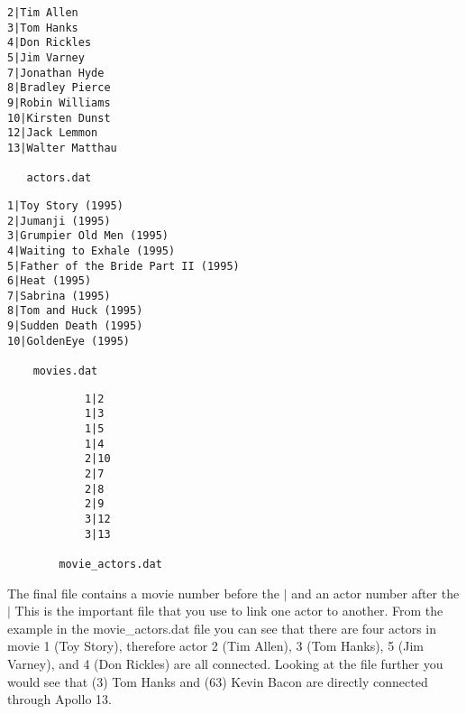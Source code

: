 \documentclass[11pt]{article}
\begin{document}
    \begin{minipage}[b]{0.33\textwidth}    
    \begin{verbatim}
2|Tim Allen
3|Tom Hanks
4|Don Rickles
5|Jim Varney
7|Jonathan Hyde
8|Bradley Pierce
9|Robin Williams
10|Kirsten Dunst
12|Jack Lemmon
13|Walter Matthau

   actors.dat
     \end{verbatim}
     \end{minipage}%
    \begin{minipage}[b]{0.33\textwidth}
    \begin{verbatim}
1|Toy Story (1995)
2|Jumanji (1995)
3|Grumpier Old Men (1995)
4|Waiting to Exhale (1995)
5|Father of the Bride Part II (1995)
6|Heat (1995)
7|Sabrina (1995)
8|Tom and Huck (1995)
9|Sudden Death (1995)
10|GoldenEye (1995)
    
    movies.dat
     \end{verbatim}
     \end{minipage}%
     \begin{minipage}[b]{0.33\textwidth}
        \begin{verbatim}
            1|2
            1|3
            1|5
            1|4
            2|10
            2|7
            2|8
            2|9
            3|12
            3|13
        
        movie_actors.dat
         \end{verbatim}
    \end{minipage}

The final file contains a movie number before the $|$ and an actor number after the $|$ This is the important file that you use to link one actor to another.  From the example in the movie\_actors.dat file you can see that there are four actors in movie 1 (Toy Story), therefore actor 2 (Tim Allen), 3 (Tom Hanks), 5 (Jim Varney), and 4 (Don Rickles) are all connected.  Looking at the file further you would see that (3) Tom Hanks and (63) Kevin Bacon are directly connected through Apollo 13.
\end{document}
